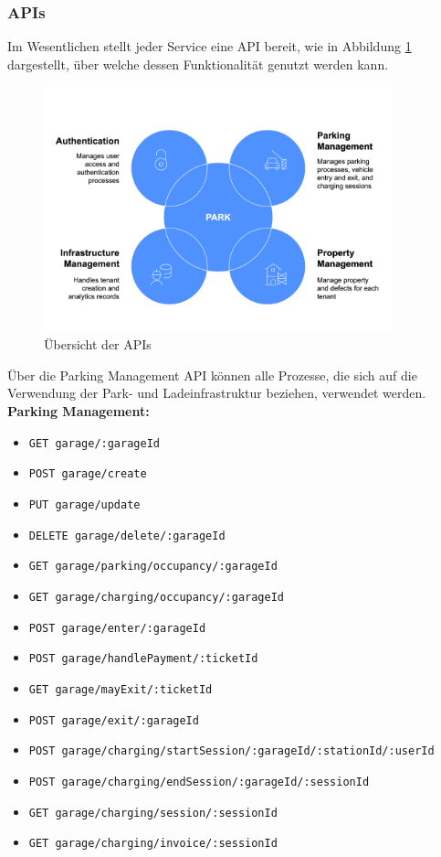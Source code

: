 \subsubsection{APIs}
Im Wesentlichen stellt jeder Service eine API bereit, wie in Abbildung \ref{fig:api-overview} dargestellt, über welche dessen Funktionalität genutzt werden kann.

\begin{figure}[ht]
    \centering
    \includegraphics[width=0.9\textwidth]{resources/api-overview-blue.png}
    \caption{Übersicht der APIs}
    \label{fig:api-overview}
\end{figure}

Über die Parking Management API können alle Prozesse, die sich auf die Verwendung der Park- und Ladeinfrastruktur beziehen, verwendet werden. \\

\textbf{Parking Management:}
\begin{itemize}[noitemsep]
    \item[] \verb|GET garage/:garageId|
    \item[] \verb|POST garage/create|
    \item[] \verb|PUT garage/update|
    \item[] \verb|DELETE garage/delete/:garageId|
    \item[] \verb|GET garage/parking/occupancy/:garageId|
    \item[] \verb|GET garage/charging/occupancy/:garageId|
    \item[] \verb|POST garage/enter/:garageId|
    \item[] \verb|POST garage/handlePayment/:ticketId|
    \item[] \verb|GET garage/mayExit/:ticketId|
    \item[] \verb|POST garage/exit/:garageId|
    \item[] \verb|POST garage/charging/startSession/:garageId/:stationId/:userId|
    \item[] \verb|POST garage/charging/endSession/:garageId/:sessionId|
    \item[] \verb|GET garage/charging/session/:sessionId|
    \item[] \verb|GET garage/charging/invoice/:sessionId|
\end{itemize}


